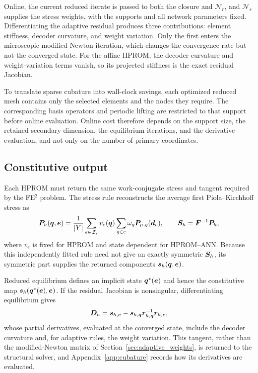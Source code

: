 Online, the current reduced iterate is passed to both the closure and $\mathcal N_r$, and $\mathcal N_s$ supplies the stress weights, with the supports and all network parameters fixed. Differentiating the adaptive residual produces three contributions: element stiffness, decoder curvature, and weight variation. Only the first enters the microscopic modified-Newton iteration, which changes the convergence rate but not the converged state. For the affine HPROM, the decoder curvature and weight-variation terms vanish, so its projected stiffness is the exact residual Jacobian.

To translate sparse cubature into wall-clock savings, each optimized reduced mesh contains only the selected elements and the nodes they require. The corresponding basis operators and periodic lifting are restricted to that support before online evaluation. Online cost therefore depends on the support size, the retained secondary dimension, the equilibrium iterations, and the derivative evaluation, and not only on the number of primary coordinates.

\subsection{Constitutive output}
\label{sec:reduced_outputs}
Each HPROM must return the same work-conjugate stress and tangent required by the FE$^2$ problem. The stress rule reconstructs the average first Piola--Kirchhoff stress as
\begin{equation}
 \bm P_h(\bm q,\bm e)=
 \frac1{|Y|}\sum_{e\in\mathcal Z_s}v_e(\bm q)
        \sum_{g\in e}\omega_g\bm P_{\mu,g}(\bm d_e),\qquad
 \bm S_h=\bm F^{-1}\bm P_h ,
 \label{eq:hyperreduced_stress}
\end{equation}
where $v_e$ is fixed for HPROM and state dependent for HPROM--ANN. Because this independently fitted rule need not give an exactly symmetric $\bm S_h$, its symmetric part supplies the returned components $\bm s_h(\bm q,\bm e)$.

Reduced equilibrium defines an implicit state $\bm q^*(\bm e)$ and hence the constitutive map $\bm s_h(\bm q^*(\bm e),\bm e)$. If the residual Jacobian is nonsingular, differentiating equilibrium gives
\begin{equation}
 \bm D_h=\bm s_{h,\bm e}
       -\bm s_{h,\bm q}\bm r_{h,\bm q}^{-1}\bm r_{h,\bm e},
 \label{eq:reduced_ift}
\end{equation}
whose partial derivatives, evaluated at the converged state, include the decoder curvature and, for adaptive rules, the weight variation. This tangent, rather than the modified-Newton matrix of Section~\ref{sec:adaptive_weights}, is returned to the structural solver, and Appendix~\ref{app:cubature} records how its derivatives are evaluated.

